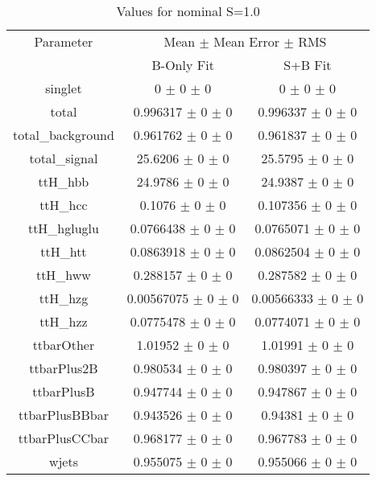 \begin{table}
\centering
\caption{Values for nominal S=1.0}
\begin{tabular}{ccc}
\toprule
Parameter 	& \multicolumn{2}{c}{Mean $\pm$ Mean Error $\pm$ RMS}\\
 	& B-Only Fit & S+B Fit\\
\midrule
singlet 	& \num{0} $\pm$ \num{0} $\pm$ \num{0} 	& \num{0} $\pm$ \num{0} $\pm$ \num{0}\\
total 	& \num{0.996317} $\pm$ \num{0} $\pm$ \num{0} 	& \num{0.996337} $\pm$ \num{0} $\pm$ \num{0}\\
total\_background 	& \num{0.961762} $\pm$ \num{0} $\pm$ \num{0} 	& \num{0.961837} $\pm$ \num{0} $\pm$ \num{0}\\
total\_signal 	& \num{25.6206} $\pm$ \num{0} $\pm$ \num{0} 	& \num{25.5795} $\pm$ \num{0} $\pm$ \num{0}\\
ttH\_hbb 	& \num{24.9786} $\pm$ \num{0} $\pm$ \num{0} 	& \num{24.9387} $\pm$ \num{0} $\pm$ \num{0}\\
ttH\_hcc 	& \num{0.1076} $\pm$ \num{0} $\pm$ \num{0} 	& \num{0.107356} $\pm$ \num{0} $\pm$ \num{0}\\
ttH\_hgluglu 	& \num{0.0766438} $\pm$ \num{0} $\pm$ \num{0} 	& \num{0.0765071} $\pm$ \num{0} $\pm$ \num{0}\\
ttH\_htt 	& \num{0.0863918} $\pm$ \num{0} $\pm$ \num{0} 	& \num{0.0862504} $\pm$ \num{0} $\pm$ \num{0}\\
ttH\_hww 	& \num{0.288157} $\pm$ \num{0} $\pm$ \num{0} 	& \num{0.287582} $\pm$ \num{0} $\pm$ \num{0}\\
ttH\_hzg 	& \num{0.00567075} $\pm$ \num{0} $\pm$ \num{0} 	& \num{0.00566333} $\pm$ \num{0} $\pm$ \num{0}\\
ttH\_hzz 	& \num{0.0775478} $\pm$ \num{0} $\pm$ \num{0} 	& \num{0.0774071} $\pm$ \num{0} $\pm$ \num{0}\\
ttbarOther 	& \num{1.01952} $\pm$ \num{0} $\pm$ \num{0} 	& \num{1.01991} $\pm$ \num{0} $\pm$ \num{0}\\
ttbarPlus2B 	& \num{0.980534} $\pm$ \num{0} $\pm$ \num{0} 	& \num{0.980397} $\pm$ \num{0} $\pm$ \num{0}\\
ttbarPlusB 	& \num{0.947744} $\pm$ \num{0} $\pm$ \num{0} 	& \num{0.947867} $\pm$ \num{0} $\pm$ \num{0}\\
ttbarPlusBBbar 	& \num{0.943526} $\pm$ \num{0} $\pm$ \num{0} 	& \num{0.94381} $\pm$ \num{0} $\pm$ \num{0}\\
ttbarPlusCCbar 	& \num{0.968177} $\pm$ \num{0} $\pm$ \num{0} 	& \num{0.967783} $\pm$ \num{0} $\pm$ \num{0}\\
wjets 	& \num{0.955075} $\pm$ \num{0} $\pm$ \num{0} 	& \num{0.955066} $\pm$ \num{0} $\pm$ \num{0}\\
\bottomrule
\end{tabular}
\end{table}